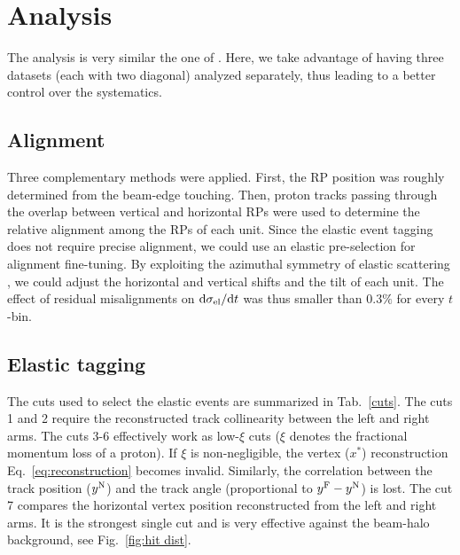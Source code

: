\documentclass[doublecol]{../macros/epl2}
\def\d{{\rm d}}
\begin{document}
\section{Analysis}

The analysis is very similar the one of \cite{epl96}. Here, we take advantage of having three datasets (each with two diagonal) analyzed separately, thus leading to a better control over the systematics.


\subsection{Alignment}

Three complementary methods were applied. First, the RP position was roughly determined from the beam-edge touching. Then, proton tracks passing through the overlap between vertical and horizontal RPs were used to determine the relative alignment among the RPs of each unit. Since the elastic event tagging does not require precise alignment, we could use an elastic pre-selection for alignment fine-tuning. By exploiting the azimuthal symmetry of elastic scattering%
, we could adjust the horizontal and vertical shifts and the tilt of each unit. The effect of residual misalignments on $\d\sigma_{\rm el}/\d t$ was thus smaller than $0.3\%$ for every $t$-bin.


\subsection{Elastic tagging}

The cuts used to select the elastic events are summarized in Tab.~\ref{cuts}. The cuts 1 and 2 require the reconstructed track collinearity between the left and right arms. The cuts 3-6 effectively work as low-$\xi$ cuts ($\xi$ denotes the fractional momentum loss of a proton). If $\xi$ is non-negligible, the vertex ($x^*$) reconstruction Eq.~\ref{eq:reconstruction} becomes invalid. Similarly, the correlation between the track position ($y^{\rm N}$) and the track angle (proportional to $y^{\rm F} - y^{\rm N}$) is lost. The cut 7 compares the horizontal vertex position reconstructed from the left and right arms. It is the strongest single cut and is very effective against the beam-halo background, see Fig.~\ref{fig:hit dist}.
\end{document}
